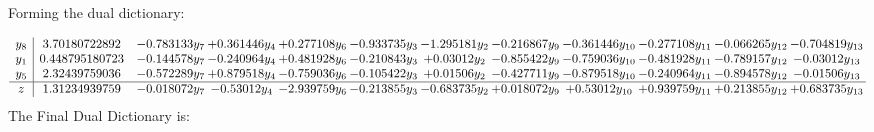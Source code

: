 \documentclass[11pt]{article}
\begin{document}
Forming the dual dictionary:

\[\begin{array}{c| c c@{\hskip 2pt} c@{\hskip 2pt} c@{\hskip 2pt} c@{\hskip 2pt} c@{\hskip 2pt} c@{\hskip 2pt} c@{\hskip 2pt} c@{\hskip 2pt} c@{\hskip 2pt} c@{\hskip 2pt} }
 y_{8}   &  3.70180722892 & -0.783133 y_{7} & + 0.361446 y_{4} & + 0.277108 y_{6} & -0.933735 y_{3} & -1.295181 y_{2} & -0.216867 y_{9} & -0.361446 y_{10} & -0.277108 y_{11} & -0.066265 y_{12} & -0.704819 y_{13}\\
 y_{1}   &  0.448795180723 & -0.144578 y_{7} & -0.240964 y_{4} & + 0.481928 y_{6} & -0.210843 y_{3} & + 0.03012 y_{2} & -0.855422 y_{9} & -0.759036 y_{10} & -0.481928 y_{11} & -0.789157 y_{12} & -0.03012 y_{13}\\
 y_{5}   &  2.32439759036 & -0.572289 y_{7} & + 0.879518 y_{4} & -0.759036 y_{6} & -0.105422 y_{3} & + 0.01506 y_{2} & -0.427711 y_{9} & -0.879518 y_{10} & -0.240964 y_{11} & -0.894578 y_{12} & -0.01506 y_{13}\\
\hline
z    &  1.31234939759 & -0.018072 y_{7} & -0.53012 y_{4} & -2.939759 y_{6} & -0.213855 y_{3} & -0.683735 y_{2} & + 0.018072 y_{9} & + 0.53012 y_{10} & + 0.939759 y_{11} & + 0.213855 y_{12} & + 0.683735 y_{13}\\
\end{array}\]
The Final Dual Dictionary is: 
\end{document}
